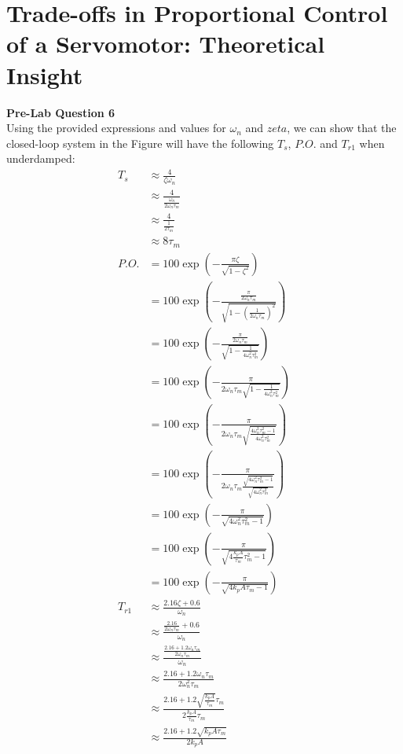 \documentclass[12pt]{article}
\begin{document}
\section{Trade-offs in Proportional Control of a Servomotor: Theoretical Insight}
\textbf{Pre-Lab Question 6} \\
Using the provided expressions and values for $\omega_n$ and $zeta$, we can show that the closed-loop system in the Figure will have the following $T_s$, $P.O.$ and $T_{r1}$ when underdamped:
\begin{align*}
    T_s &\approx \frac{4}{\zeta\omega_n} \\
    &\approx \frac{4}{\frac{\omega_n}{2\omega_n\tau_m}} \\
    &\approx \frac{4}{\frac{1}{2\tau_m}} \\
    &\approx 8\tau_m \\
    P.O. &= 100\exp\left(-\frac{\pi\zeta}{\sqrt{1-\zeta^2}}\right) \\
    &= 100\exp\left(-\frac{\frac{\pi}{2\omega_n\tau_m}}{\sqrt{1-\left(\frac{1}{2\omega_n\tau_m}\right)^2}}\right) \\
    &= 100\exp\left(-\frac{\frac{\pi}{2\omega_n\tau_m}}{\sqrt{1-\frac{1}{4\omega_n^2\tau_m^2}}}\right) \\
    &= 100\exp\left(-\frac{\pi}{2\omega_n\tau_m\sqrt{1-\frac{1}{4\omega_n^2\tau_m^2}}}\right) \\
    &= 100\exp\left(-\frac{\pi}{2\omega_n\tau_m\sqrt{\frac{4\omega_n^2\tau_m^2 - 1}{4\omega_n^2\tau_m^2}}}\right) \\
    &= 100\exp\left(-\frac{\pi}{2\omega_n\tau_m\frac{\sqrt{4\omega_n^2\tau_m^2 - 1}}{\sqrt{4\omega_n^2\tau_m^2}}}\right) \\
    &= 100\exp\left(-\frac{\pi}{\sqrt{4\omega_n^2\tau_m^2 - 1}}\right) \\
    &= 100\exp\left(-\frac{\pi}{\sqrt{4\frac{k_pA}{\tau_m}\tau_m^2 - 1}}\right) \\
    &= 100\exp\left(-\frac{\pi}{\sqrt{4k_pA\tau_m - 1}}\right) \\
    T_{r1} &\approx \frac{2.16\zeta + 0.6}{\omega_n} \\
    &\approx \frac{\frac{2.16}{2\omega_n\tau_m} + 0.6}{\omega_n} \\
    &\approx \frac{\frac{2.16 + 1.2\omega_n\tau_m}{2\omega_n\tau_m}}{\omega_n} \\
    &\approx \frac{2.16 + 1.2\omega_n\tau_m}{2\omega_n^2\tau_m} \\
    &\approx \frac{2.16 + 1.2\sqrt{\frac{k_pA}{\tau_m}}\tau_m}{2\frac{k_pA}{\tau_m}\tau_m} \\
    &\approx \frac{2.16 + 1.2\sqrt{k_pA\tau_m}}{2k_pA} \\
\end{align*}
\end{document}
